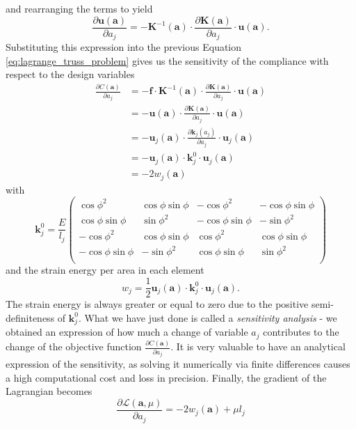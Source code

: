 and rearranging the terms to yield
\begin{equation}
    \frac{\partial \mathbf{u} (\mathbf{a})}{\partial a_j} = - \mathbf{K}^{-1}(\mathbf{a}) \cdot \frac{\partial \mathbf{K} (\mathbf{a})}{\partial a_j}  \cdot \mathbf{u} (\mathbf{a}).
\end{equation}
Substituting this expression into the previous Equation \eqref{eq:lagrange_truss_problem} gives us the sensitivity of the compliance with respect to the design variables 
\begin{align}
    \frac{\partial C (\mathbf{a})}{\partial a_j} 
    &= - \mathbf{f} \cdot \mathbf{K}^{-1}(\mathbf{a}) \cdot \frac{\partial \mathbf{K} (\mathbf{a})}{\partial a_j} \cdot \mathbf{u} (\mathbf{a})  \\
    &= - \mathbf{u} (\mathbf{a}) \cdot \frac{\partial \mathbf{K} (\mathbf{a})}{\partial a_j} \cdot \mathbf{u} (\mathbf{a})  \\
    &= - \mathbf{u}_j (\mathbf{a}) \cdot \frac{\partial \mathbf{k}_j(a_j)}{\partial a_j} \cdot \mathbf{u}_j (\mathbf{a})  \\
    &= - \mathbf{u}_j (\mathbf{a}) \cdot \mathbf{k}^0_j \cdot \mathbf{u}_j (\mathbf{a})  \\
    &= - 2 w_j (\mathbf{a})
    \label{eq:compliance_sensitivity}
\end{align}
with 
\begin{equation}
    \mathbf{k}_j^0 = \frac{E}{l_j}
    \begin{pmatrix}
    \cos{\phi}^2 & \cos{\phi}\sin{\phi} & -\cos{\phi}^2 & -\cos{\phi}\sin{\phi} \\
    \cos{\phi}\sin{\phi} & \sin{\phi}^2 & -\cos{\phi}\sin{\phi} & -\sin{\phi}^2 \\
    -\cos{\phi}^2 & \cos{\phi}\sin{\phi} & \cos{\phi}^2 &\cos{\phi}\sin{\phi} \\
    -\cos{\phi}\sin{\phi} & -\sin{\phi}^2 & \cos{\phi}\sin{\phi} & \sin{\phi}^2 \\
    \end{pmatrix}
\end{equation}
and the strain energy per area in each element 
\begin{equation}
    w_j = \frac{1}{2} \mathbf{u}_j (\mathbf{a}) \cdot \mathbf{k}^0_j \cdot \mathbf{u}_j (\mathbf{a}).
    \label{eq:element_strain_energy}
\end{equation}
The strain energy is always greater or equal to zero due to the positive semi-definiteness of $\mathbf{k}^0_j$.
What we have just done is called a \emph{sensitivity analysis} - we obtained an expression of how much a change of variable $a_j$ contributes to the change of the objective function $\frac{\partial C (\mathbf{a})}{\partial a_j}$. It is very valuable to have an analytical expression of the sensitivity, as solving it numerically via finite differences causes a high computational cost and loss in precision.
Finally, the gradient of the Lagrangian becomes 
\begin{equation}
    \frac{\partial \mathcal{L} (\mathbf{a}, \mu)}{\partial a_j} 
    = - 2 w_j (\mathbf{a}) + \mu l_j
    \label{eq:lagrange_sensitivity}
\end{equation}

